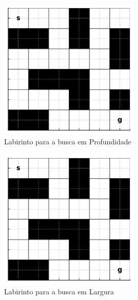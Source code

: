 \documentclass[12pt]{article}
\begin{document}
\begin{enumerate}
\begin{figure}[h]
\centering
\includegraphics[width=0.6\textwidth]{labirinto_exemplo_bw.png}
\caption{Labirinto para a busca em Profundidade}
\end{figure}

\begin{figure}[h]
\centering
\includegraphics[width=0.6\textwidth]{labirinto_exemplo_bw.png}
\caption{Labirinto para a busca em Largura}
\end{figure}

\end{enumerate}
\end{document}
